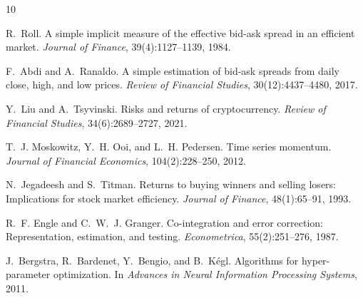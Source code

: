 \documentclass[11pt,a4paper]{article}
\begin{document}

\begin{thebibliography}{10}

R.~Roll.
\newblock A simple implicit measure of the effective bid-ask spread in an
  efficient market.
\newblock \emph{Journal of Finance}, 39(4):1127--1139, 1984.

F.~Abdi and A.~Ranaldo.
\newblock A simple estimation of bid-ask spreads from daily close, high, and
  low prices.
\newblock \emph{Review of Financial Studies}, 30(12):4437--4480, 2017.

Y.~Liu and A.~Tsyvinski.
\newblock Risks and returns of cryptocurrency.
\newblock \emph{Review of Financial Studies}, 34(6):2689--2727, 2021.

T.~J. Moskowitz, Y.~H. Ooi, and L.~H. Pedersen.
\newblock Time series momentum.
\newblock \emph{Journal of Financial Economics}, 104(2):228--250, 2012.

N.~Jegadeesh and S.~Titman.
\newblock Returns to buying winners and selling losers: Implications for stock
  market efficiency.
\newblock \emph{Journal of Finance}, 48(1):65--91, 1993.

R.~F. Engle and C.~W.~J. Granger.
\newblock Co-integration and error correction: Representation, estimation, and
  testing.
\newblock \emph{Econometrica}, 55(2):251--276, 1987.

J.~Bergstra, R.~Bardenet, Y.~Bengio, and B.~K{\'e}gl.
\newblock Algorithms for hyper-parameter optimization.
\newblock In \emph{Advances in Neural Information Processing Systems}, 2011.

\end{thebibliography}
\end{document}

